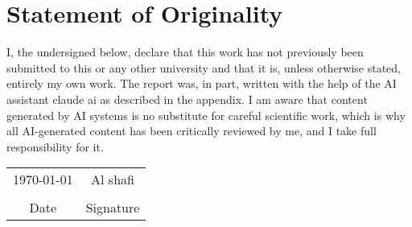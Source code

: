 \documentclass[report.tex]{subfiles}
\begin{document}
\chapter*{Statement of Originality}






I, the undersigned below, declare that this work has not previously been submitted to this or any other university and that it is, unless otherwise stated, entirely my own work. The report was, in part, written with the help of the AI assistant claude ai as described in the appendix. I am aware that content generated by AI systems is no substitute for careful scientific work, which is why all AI-generated content has been critically reviewed by me, and I take full responsibility for it.

\vspace{2cm} %

\begin{center}
    \begin{tabular}{c@{\hskip 3cm}c} %
    \today & Al shafi \\
    \underline{\hspace{5cm}} & \underline{\hspace{5cm}} \\
    Date & Signature \\
    \end{tabular}
\end{center}

\end{document}
